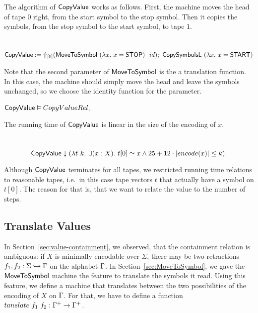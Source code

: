 The algorithm of $\MS{CopyValue}$ works as follows.  First, the machine moves the head of tape $0$ right, from the start symbol to the stop symbol.
Then it copies the symbols, from the stop symbol to the start symbol, to tape $1$.

\begin{definition}[$\MS{CopyValue}$][CopyValue]
  \label{def:CopyValue}
  ~
  \small
  \[
    \MS{CopyValue} := \LiftTapes{(\MS{MoveToSymbol}~(\lambda x.~x=\MS{STOP})~~id)}{\Vector{0}} \Seq \MS{CopySymbolsL}~(\lambda x.~x=\MS{START})
  \]
\end{definition}

Note that the second parameter of $\MS{MoveToSymbol}$ is the a translation function.  In this case, the machine should simply move the head and leave
the symbols unchanged, so we choose the identity function for the parameter.

\begin{lemma}
  \label{lem:CopyValue_Realise}
  $\MS{CopyValue} \Realise CopyValueRel$.
\end{lemma}

The running time of $\MS{CopyValue}$ is linear in the size of the encoding of $x$.
\begin{lemma}
  \label{lem:CopyValue_TerminatesIn}
  ~
  \[
    \MS{CopyValue} \TerminatesIn (\lambda t~k.~\exists(x:X).~t[0] \simeq x \land 25 + 12 \cdot \size{x} \leq k).
  \]
\end{lemma}

Although $\MS{CopyValue}$ terminates for all tapes, we restricted running time relations to reasonable tapes, i.e.\ in this case tape vectors $t$ that
actually have a symbol on $t[0]$.  The reason for that is, that we want to relate the value to the number of steps.

\subsection{Translate Values}
\label{sec:Translate}

In Section~\ref{sec:value-containment}, we observed, that the containment relation is ambiguous: if $X$ is minimally encodable over $\Sigma$, there
may be two retractions $f_1, f_2 : \Sigma \hookrightarrow \Tau$ on the alphabet $\Tau$.  In Section~\ref{sec:MoveToSymbol}, we gave the
$\MS{MoveToSymbol}$ machine the feature to translate the symbols it read.  Using this feature, we define a machine that translates between the two
possibilities of the encoding of $X$ on $\Tau$.  For that, we have to define a function $tanslate~f_1~f_2 : \Tau^+ \to \Tau^+$.

